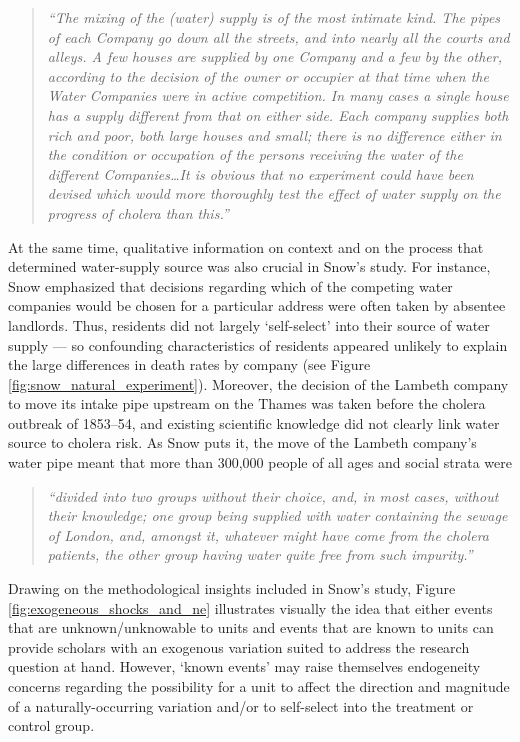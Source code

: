 \begin{refsection}
\begin{quote}
  \textit{
  ``The mixing of the (water) supply is of the most intimate kind. The pipes of
  each Company go down all the streets, and into nearly all the courts and
  alleys. A few houses are supplied by one Company and a few by the other,
  according to the decision of the owner or occupier at that time when the Water
  Companies were in active competition. In many cases a single house has a
  supply different from that on either side. Each company supplies both rich and
  poor, both large houses and small; there is no difference either in the
  condition or occupation of the persons receiving the water of the different
  Companies\ldots It is obvious that no experiment could have been devised which
  would more thoroughly test the effect of water supply on the progress of
  cholera than this.''
  }
  \parencite[][pages 74–75]{snow_1855}
\end{quote}

At the same time, qualitative information on context and on the process that
determined water-supply source was also crucial in Snow's study. For instance,
Snow emphasized that decisions regarding which of the competing water companies
would be chosen for a particular address were often taken by absentee landlords.
Thus, residents did not largely `self-select' into their source of water
supply --- so confounding characteristics of residents appeared unlikely to
explain the large differences in death rates by company (see Figure
\ref{fig:snow_natural_experiment}). Moreover, the decision of the Lambeth
company to move its intake pipe upstream on the Thames was taken before the
cholera outbreak of 1853–54, and existing scientific knowledge did not clearly
link water source to cholera risk. As Snow puts it, the move of the Lambeth
company's water pipe meant that more than 300,000 people of all ages and social
strata were

\begin{quote}
  \textit{``divided into two groups without their choice, and, in most cases, 
  without their knowledge; one group being supplied with water containing the 
  sewage of London, and, amongst it, whatever might have come from the cholera 
  patients, the other group having water quite free from such impurity.''}
  \parencite[][pages 74–75]{snow_1855}
\end{quote}

Drawing on the methodological insights included in Snow's study, Figure 
\ref{fig:exogeneous_shocks_and_ne} illustrates visually the idea that either
events that are unknown/unknowable to units and events that are known to units
can provide scholars with an exogenous variation suited to address the research 
question at hand. However, `known events' may raise themselves endogeneity concerns
regarding the possibility for a unit to affect the direction and magnitude of a 
naturally-occurring variation and/or to self-select into the treatment 
or control group.


\end{refsection}
